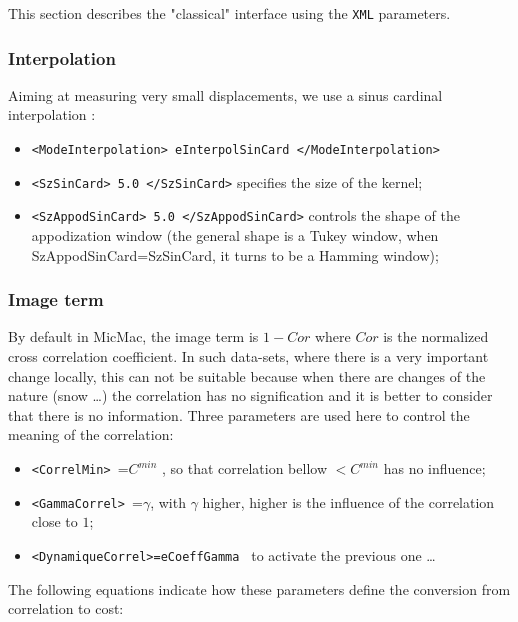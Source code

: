 This section describes the "classical" interface using the {\tt XML} parameters.

\subsubsection{Interpolation}

Aiming at measuring very small displacements, we use a sinus cardinal interpolation :

\begin{itemize}
   \item {\tt <ModeInterpolation> eInterpolSinCard </ModeInterpolation>}

   \item  {\tt <SzSinCard>  5.0 </SzSinCard>} specifies the size of the kernel;

   \item  {\tt  <SzAppodSinCard>  5.0 </SzAppodSinCard>} controls the shape of the appodization
          window (the general shape is a Tukey window, when SzAppodSinCard=SzSinCard, it turns to be
          a Hamming window);
\end{itemize}


\subsubsection{Image term}

\label{Image:Term}

By default in MicMac, the image term is $1-Cor$ where $Cor$ is the normalized cross correlation
coefficient. In such data-sets, where there is a very important change locally, this can not be
suitable because when there are changes of the nature (snow \dots)  the correlation has no
signification and it is better to consider that there is no information. %
Three parameters are used here to control the meaning of the correlation:


\begin{itemize}
   \item {\tt  <CorrelMin> }=$C^{min}$ ,
         so  that correlation bellow $<C^{min}$ has no influence;
   \item {\tt  <GammaCorrel> }=$\gamma$, with $\gamma$ higher, higher is the influence of the correlation
         close to $1$;
   \item {\tt  <DynamiqueCorrel>=eCoeffGamma } to activate the previous one \dots
\end{itemize}

The following equations indicate how these parameters define the conversion from correlation to cost:

